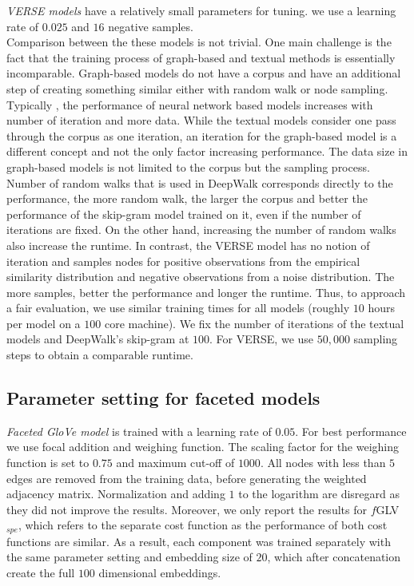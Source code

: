 \noindent
\emph{VERSE models} have a relatively small parameters for tuning. we use a learning rate of $0.025$ and $16$ negative samples.\\

\noindent
Comparison between the these models is not trivial. One main challenge is the fact that the training process of graph-based and textual methods is essentially incomparable. Graph-based models do not have a corpus and have an additional step of creating something similar either with random walk or node sampling. Typically , the performance of neural network based models increases with number of iteration and more data. While the textual models consider one pass through the corpus as one iteration, an iteration for the graph-based model is a different concept and not the only factor increasing performance. The data size in graph-based models is not limited to the corpus but the sampling process. Number of random walks that is used in DeepWalk corresponds directly to the performance, the more random walk, the larger the corpus and better the performance of the skip-gram model trained on it, even if the number of iterations are fixed. On the other hand, increasing the number of random walks also increase the runtime. In contrast, the VERSE model has no notion of iteration and samples nodes for positive observations from the empirical similarity distribution and negative observations from a  noise distribution. The more samples, better the performance and longer the runtime. Thus, to approach a fair evaluation, we use similar training times for all models (roughly $10$ hours per model on a $100$ core machine). We fix the number of iterations of the textual models and DeepWalk's skip-gram at $100$. For VERSE, we use $50,000$ sampling steps to obtain a comparable runtime.

\subsection{Parameter setting for faceted models}
\emph{Faceted GloVe model} is trained with a learning rate of $0.05$. For best performance we use focal addition and weighing function. The scaling factor for the weighing function is set to $0.75$ and maximum cut-off of $1000$. All nodes with less than $5$ edges are removed from the training data, before generating the weighted adjacency matrix. Normalization and adding $1$ to the logarithm are disregard as they did not improve the results. Moreover, we only report the results for $f$GLV$_{spe}$, which refers to the separate cost function as the performance of both cost functions are similar. As a result, each component was trained separately with the same parameter setting and embedding size of $20$, which after concatenation create the full $100$ dimensional embeddings. \\

